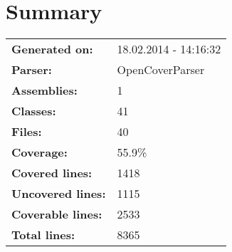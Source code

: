 \documentclass[a4paper,10pt]{article}
\begin{document}
\setcounter{secnumdepth}{-1}
\section{Summary}
\begin{longtable}[l]{ll}
\textbf{Generated on:} & 18.02.2014 - 14:16:32\\
\textbf{Parser:} & OpenCoverParser\\
\textbf{Assemblies:} & 1\\
\textbf{Classes:} & 41\\
\textbf{Files:} & 40\\
\textbf{Coverage:} & 55.9\%\\
\textbf{Covered lines:} & 1418\\
\textbf{Uncovered lines:} & 1115\\
\textbf{Coverable lines:} & 2533\\
\textbf{Total lines:} & 8365\\
\end{longtable}
\end{document}
